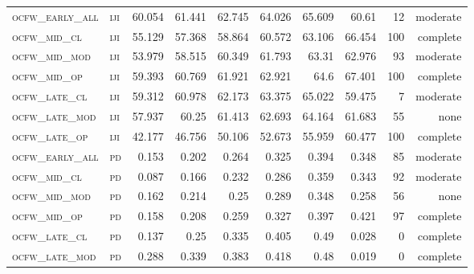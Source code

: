\begin{landscape}
\begin{center}
\begin{footnotesize}
\begin{longtable}{llrrrrr|rrr}
\textsc{ocfw\_early\_all} & \textsc{iji       }    & 60.054   & 61.441   & 62.745   & 64.026   & 65.609     & 60.61         & 12            & moderate        \\
\textsc{ocfw\_mid\_cl   } & \textsc{iji       }    & 55.129   & 57.368   & 58.864   & 60.572   & 63.106     & 66.454        & 100           & complete             \\
\textsc{ocfw\_mid\_mod  } & \textsc{iji       }    & 53.979   & 58.515   & 60.349   & 61.793   & 63.31      & 62.976        & 93            & moderate        \\
\textsc{ocfw\_mid\_op   } & \textsc{iji       }    & 59.393   & 60.769   & 61.921   & 62.921   & 64.6       & 67.401        & 100           & complete             \\
\textsc{ocfw\_late\_cl  } & \textsc{iji       }    & 59.312   & 60.978   & 62.173   & 63.375   & 65.022     & 59.475        & 7             & moderate        \\
\textsc{ocfw\_late\_mod } & \textsc{iji       }    & 57.937   & 60.25    & 61.413   & 62.693   & 64.164     & 61.683        & 55            & none        \\
\textsc{ocfw\_late\_op  } & \textsc{iji       }    & 42.177   & 46.756   & 50.106   & 52.673   & 55.959     & 60.477        & 100           & complete             \\
\textsc{ocfw\_early\_all} & \textsc{pd        }    & 0.153    & 0.202    & 0.264    & 0.325    & 0.394      & 0.348         & 85            & moderate        \\
\textsc{ocfw\_mid\_cl   } & \textsc{pd        }    & 0.087    & 0.166    & 0.232    & 0.286    & 0.359      & 0.343         & 92            & moderate        \\
\textsc{ocfw\_mid\_mod  } & \textsc{pd        }    & 0.162    & 0.214    & 0.25     & 0.289    & 0.348      & 0.258         & 56            & none        \\
\textsc{ocfw\_mid\_op   } & \textsc{pd        }    & 0.158    & 0.208    & 0.259    & 0.327    & 0.397      & 0.421         & 97            & complete        \\
\textsc{ocfw\_late\_cl  } & \textsc{pd        }    & 0.137    & 0.25     & 0.335    & 0.405    & 0.49       & 0.028         & 0             & complete            \\
\textsc{ocfw\_late\_mod } & \textsc{pd        }    & 0.288    & 0.339    & 0.383    & 0.418    & 0.48       & 0.019         & 0             & complete            \\

\end{longtable}
\end{footnotesize}
\end{center}
\end{landscape}
